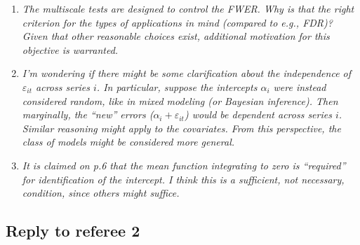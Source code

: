 \documentclass[a4paper,12pt]{article}
\begin{document}
\begin{enumerate}[label=\arabic*.,leftmargin=0.6cm]
  
\item \textit{The multiscale tests are designed to control the FWER. Why is that the right criterion for the types of applications in mind (compared to e.g., FDR)? Given that other reasonable choices exist, additional motivation for this objective is warranted.}


\item \textit{I'm wondering if there might be some clarification about the independence of $\varepsilon_{it}$ across series $i$. In particular, suppose the intercepts $\alpha_i$ were instead considered random, like in mixed modeling (or Bayesian inference). Then marginally, the ``new'' errors ($\alpha_i + \varepsilon_{it}$) would be dependent across series $i$. Similar reasoning might apply to the covariates. From this perspective, the class of models might be considered more general.}

  
\item \textit{It is claimed on p.6 that the mean function integrating to zero is ``required'' for identification of the intercept. I think this is a sufficient, not necessary, condition, since others might suffice.} 

  
\end{enumerate}



\subsection*{Reply to referee 2}
\end{document}
